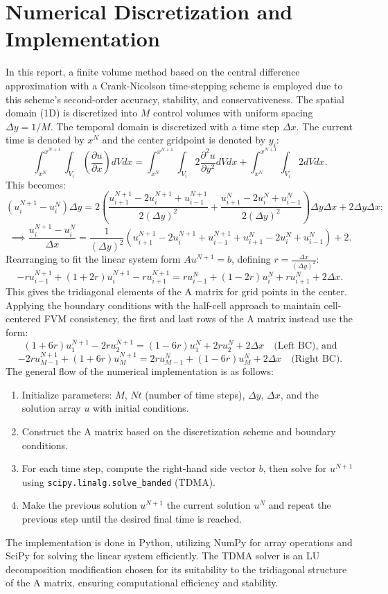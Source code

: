 \documentclass[11pt]{article}
\begin{document}
\section{Numerical Discretization and Implementation}
In this report, a finite volume method based on the central difference approximation with a Crank-Nicolson time-stepping scheme 
is employed due to this scheme's second-order accuracy, stability, and conservativeness. The spatial domain (1D) is discretized into
$M$ control volumes with uniform spacing $\Delta y = 1/M$. The temporal domain is discretized with a time step $\Delta x$.
The current time is denoted by $x^N$ and the center gridpoint is denoted by $y_i$:
$$
\int_{x^N}^{x^{N+1}}\int_{V_i}\left(\frac{\partial u}{\partial x}\right)dVdx=\int_{x^N}^{x^{N+1}}\int_{V_i}
2\frac{\partial^2 u}{\partial y^2}dVdx+\int_{x^N}^{x^{N+1}}\int_{V_i}2dVdx.
$$
This becomes:
$$
(u^{N+1}_i-u^N_i)\Delta y=2\left(\frac{u^{N+1}_{i+1}-2u^{N+1}_i+u^{N+1}_{i-1}}{2(\Delta y)^2}+
\frac{u^{N}_{i+1}-2u^{N}_i+u^{N}_{i-1}}{2(\Delta y)^2}\right)\Delta y\Delta x+2\Delta y\Delta x;
$$
$$
\implies \frac{u^{N+1}_i-u^N_i}{\Delta x}=\frac{1}{(\Delta y)^2}(u^{N+1}_{i+1}-2u^{N+1}_i+u^{N+1}_{i-1}+u^{N}_{i+1}-2u^{N}_i+
u^{N}_{i-1})+2.
$$
Rearranging to fit the linear system form $Au^{N+1}=b$, defining $r=\frac{\Delta x}{(\Delta y)^2}$:
$$
-r u^{N+1}_{i-1}+(1+2r)u^{N+1}_i-r u^{N+1}_{i+1} = r u^{N}_{i-1}+(1-2r)u^{N}_i+r u^{N}_{i+1}+2\Delta x.
$$
This gives the tridiagonal elements of the A matrix for grid points in the center. Applying the boundary conditions with the 
half-cell approach to maintain cell-centered FVM consistency, the first and last rows of the A matrix instead use the form:
$$
(1+6r)u_1^{N+1}-2ru_2^{N+1}=(1-6r)u_1^{N}+2ru_2^N+2\Delta x\quad\text{(Left BC), and}
$$
$$
-2ru_{M-1}^{N+1}+(1+6r)u_M^{N+1}=2ru_{M-1}^{N}+(1-6r)u_M^{N}+2\Delta x\quad\text{(Right BC).}
$$
The general flow of the numerical implementation is as follows:
\begin{enumerate}
    \item Initialize parameters: $M$, $Nt$ (number of time steps), $\Delta y$, $\Delta x$, and the solution array $u$ with initial
     conditions.
    \item Construct the A matrix based on the discretization scheme and boundary conditions.
    \item For each time step, compute the right-hand side vector $b$, then solve for $u^{N+1}$ using 
    \lstinline|scipy.linalg.solve_banded| (TDMA).
    \item Make the previous solution $u^{N+1}$ the current solution $u^N$ and repeat the previous step until the desired
     final time is reached.
\end{enumerate}
The implementation is done in Python, utilizing NumPy for array operations and SciPy for solving the linear system efficiently. 
The TDMA solver is an LU decomposition modification chosen for its suitability to the tridiagonal structure of the A matrix, 
ensuring computational efficiency and stability.
\end{document}
